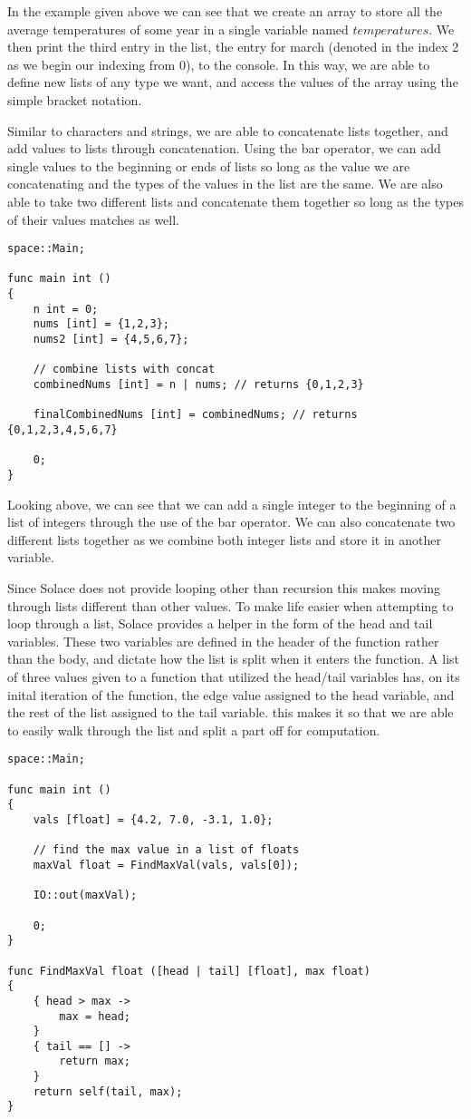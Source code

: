 \documentclass{article}
\begin{document}
In the example given above we can see that we create an array to store all the average temperatures of some year in a single variable named $temperatures$. We then
print the third entry in the list, the entry for march (denoted in the index 2 as we begin our indexing from 0), to the console. In this way, we are able to define
new lists of any type we want, and access the values of the array using the simple bracket notation.

Similar to characters and strings, we are able to concatenate lists together, and add values to lists through concatenation. Using the bar operator, we can add single
values to the beginning or ends of lists so long as the value we are concatenating and the types of the values in the list are the same. We are also able to take two
different lists and concatenate them together so long as the types of their values matches as well.

\begin{lstlisting}
space::Main;

func main int ()
{
	n int = 0;
	nums [int] = {1,2,3};
	nums2 [int] = {4,5,6,7};

	// combine lists with concat
	combinedNums [int] = n | nums; // returns {0,1,2,3}

	finalCombinedNums [int] = combinedNums; // returns {0,1,2,3,4,5,6,7}

	0;
}
\end{lstlisting}

Looking above, we can see that we can add a single integer to the beginning of a list of integers through the use of the bar operator. We can also concatenate two
different lists together as we combine both integer lists and store it in another variable.

Since Solace does not provide looping other than recursion this makes moving through lists different than other values. To make life easier when attempting to loop
through a list, Solace provides a helper in the form of the head and tail variables. These two variables are defined in the header of the function rather than the
body, and dictate how the list is split when it enters the function. A list of three values given to a function that utilized the head/tail variables has, on its
inital iteration of the function, the edge value assigned to the head variable, and the rest of the list assigned to the tail variable. this makes it so that 
we are able to easily walk through the list and split a part off for computation.

\begin{lstlisting}
space::Main;

func main int ()
{
	vals [float] = {4.2, 7.0, -3.1, 1.0};

	// find the max value in a list of floats
	maxVal float = FindMaxVal(vals, vals[0]);

	IO::out(maxVal);

	0;
}

func FindMaxVal float ([head | tail] [float], max float)
{
	{ head > max ->
		max = head;
	}
	{ tail == [] ->
		return max;
	}
	return self(tail, max);
}
\end{lstlisting}
\end{document}
